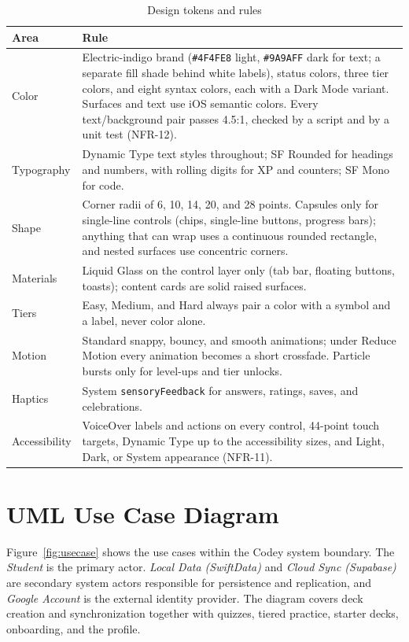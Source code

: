 \documentclass[12pt,letterpaper]{article}
\begin{document}
\begin{table}[H]
\centering
\caption{Design tokens and rules}
\label{tab:tokens}
\begin{tabularx}{\textwidth}{@{}L{2.4cm} Y@{}}
\toprule
\textbf{Area} & \textbf{Rule} \\
\midrule
Color & Electric-indigo brand (\texttt{\#4F4FE8} light, \texttt{\#9A9AFF} dark for text; a separate fill shade behind white labels), status colors, three tier colors, and eight syntax colors, each with a Dark Mode variant. Surfaces and text use iOS semantic colors. Every text/background pair passes 4.5:1, checked by a script and by a unit test (NFR-12). \\
Typography & Dynamic Type text styles throughout; SF Rounded for headings and numbers, with rolling digits for XP and counters; SF Mono for code. \\
Shape & Corner radii of 6, 10, 14, 20, and 28 points. Capsules only for single-line controls (chips, single-line buttons, progress bars); anything that can wrap uses a continuous rounded rectangle, and nested surfaces use concentric corners. \\
Materials & Liquid Glass on the control layer only (tab bar, floating buttons, toasts); content cards are solid raised surfaces. \\
Tiers & Easy, Medium, and Hard always pair a color with a symbol and a label, never color alone. \\
Motion & Standard snappy, bouncy, and smooth animations; under Reduce Motion every animation becomes a short crossfade. Particle bursts only for level-ups and tier unlocks. \\
Haptics & System \texttt{sensoryFeedback} for answers, ratings, saves, and celebrations. \\
Accessibility & VoiceOver labels and actions on every control, 44-point touch targets, Dynamic Type up to the accessibility sizes, and Light, Dark, or System appearance (NFR-11). \\
\bottomrule
\end{tabularx}
\end{table}

\section{UML Use Case Diagram}\label{sec:usecase}
Figure~\ref{fig:usecase} shows the use cases within the Codey system boundary. The
\emph{Student} is the primary actor. \emph{Local Data (SwiftData)} and \emph{Cloud
Sync (Supabase)} are secondary system actors responsible for persistence and
replication, and \emph{Google Account} is the external identity provider. The
diagram covers deck creation and synchronization together with quizzes, tiered
practice, starter decks, onboarding, and the profile.
\end{document}
